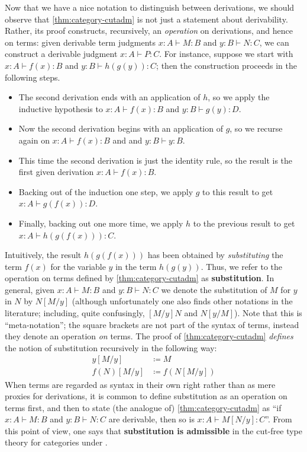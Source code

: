 \documentclass{book}
\let\types\vdash
\begin{document}
Now that we have a nice notation to distinguish between derivations, we should observe that \cref{thm:category-cutadm} is not just a statement about derivability.
Rather, its proof constructs, recursively, an \emph{operation} on derivations, and hence on terms: given derivable term judgments $x:A\types M:B$ and $y:B\types N:C$, we can construct a derivable judgment $x:A\types P:C$.
For instance, suppose we start with $x:A \types f(x):B$ and $y:B\types h(g(y)):C$; then the construction proceeds in the following steps.
\begin{itemize}
\item The second derivation ends with an application of $h$, so we apply the inductive hypothesis to $x:A \types f(x):B$ and $y:B\types g(y):D$.
\item Now the second derivation begins with an application of $g$, so we recurse again on $x:A \types f(x):B$ and and $y:B\types y:B$.
\item This time the second derivation is just the identity rule, so the result is the first given derivation $x:A \types f(x):B$.
\item Backing out of the induction one step, we apply $g$ to this result to get $x:A\types g(f(x)):D$.
\item Finally, backing out one more time, we apply $h$ to the previous result to get $x:A\types h(g(f(x))):C$.
\end{itemize}
Intuitively, the result $h(g(f(x)))$ has been obtained by \emph{substituting} the term $f(x)$ for the variable $y$ in the term $h(g(y))$.
Thus, we refer to the operation on terms defined by \cref{thm:category-cutadm} as \textbf{substitution}.
In general, given $x:A\types M:B$ and $y:B\types N:C$ we denote the substitution of $M$ for $y$ in $N$ by $N[M/y]$ (although unfortunately one also finds other notations in the literature; including, quite confusingly, $[M/y]N$ and $N[y/M]$).
Note that this is ``meta-notation''; the square brackets are not part of the syntax of terms, instead they denote an operation \emph{on} terms.
The proof of \cref{thm:category-cutadm} \emph{defines} the notion of substitution recursively in the following way:
\begin{align*}
  y[M/y] &\coloneqq M\\
  f(N)[M/y] &\coloneqq f(N[M/y])
\end{align*}
When terms are regarded as syntax in their own right rather than as mere proxies for derivations, it is common to define substitution as an operation on terms first, and then to state (the analogue of) \cref{thm:category-cutadm} as ``if $x:A\types M:B$ and $y:B\types N:C$ are derivable, then so is $x:A\types M[N/y]:C$''.
From this point of view, one says that \textbf{substitution is admissible} in the cut-free type theory for categories under \cG.
\end{document}
